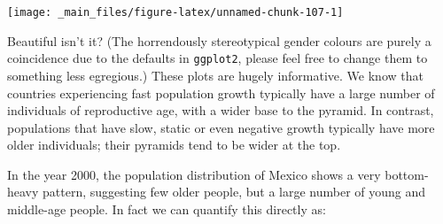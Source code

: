 \documentclass[]{book}
\newenvironment{Shaded}{\begin{snugshade}}{\end{snugshade}}
\newcommand{\KeywordTok}[1]{\textcolor[rgb]{0.13,0.29,0.53}{\textbf{{#1}}}}
\newcommand{\DataTypeTok}[1]{\textcolor[rgb]{0.13,0.29,0.53}{{#1}}}
\newcommand{\DecValTok}[1]{\textcolor[rgb]{0.00,0.00,0.81}{{#1}}}
\newcommand{\StringTok}[1]{\textcolor[rgb]{0.31,0.60,0.02}{{#1}}}
\newcommand{\NormalTok}[1]{{#1}}
\theoremstyle{definition}
\theoremstyle{definition}
\theoremstyle{definition}
\theoremstyle{remark}
\begin{document}
\begin{Shaded}
\end{Shaded}

\begin{center}\texttt{[image: \_main\_files/figure-latex/unnamed-chunk-107-1]} \end{center}

Beautiful isn't it? (The horrendously stereotypical gender colours are
purely a coincidence due to the defaults in \texttt{ggplot2}, please
feel free to change them to something less egregious.) These plots are
hugely informative. We know that countries experiencing fast population
growth typically have a large number of individuals of reproductive age,
with a wider base to the pyramid. In contrast, populations that have
slow, static or even negative growth typically have more older
individuals; their pyramids tend to be wider at the top.

In the year 2000, the population distribution of Mexico shows a very
bottom-heavy pattern, suggesting few older people, but a large number of
young and middle-age people. In fact we can quantify this directly as:
\end{document}
